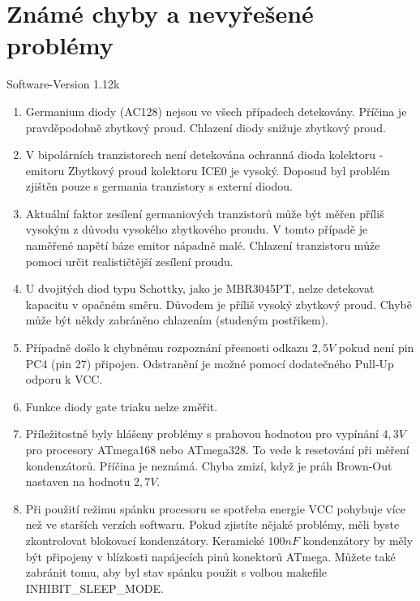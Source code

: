 \chapter{Známé chyby a nevyřešené problémy}
\vspace*{-1cm}
{\center Software-Version 1.12k}

\begin{enumerate}

\item Germanium diody (AC128) nejsou ve všech případech detekovány. Příčina je pravděpodobně zbytkový proud.
Chlazení diody snižuje zbytkový proud.

\item V bipolárních tranzistorech není detekována ochranná dioda kolektoru - emitoru
Zbytkový proud kolektoru ICE0 je vysoký. Doposud byl problém zjištěn pouze s germania tranzistory s
externí diodou.

\item Aktuální faktor zesílení germaniových tranzistorů může být měřen příliš vysokým z důvodu vysokého zbytkového proudu.
V tomto případě je naměřené napětí báze emitor nápadně malé.
Chlazení tranzistoru může pomoci určit realističtější zesílení proudu.

\item U dvojitých diod typu Schottky, jako je MBR3045PT, nelze detekovat kapacitu v opačném směru. Důvodem je příliš vysoký zbytkový proud. Chybě může být někdy zabráněno chlazením (studeným postřikem).

\item Případně došlo k chybnému rozpoznání přesnosti odkazu \(2,5V\) pokud není pin PC4 (pin 27) připojen.
Odstranění je možné pomocí dodatečného Pull-Up odporu k VCC.

\item Funkce diody gate triaku nelze změřit.

\item Příležitostně byly hlášeny problémy s prahovou hodnotou pro vypínání \(4,3V\) pro procesory ATmega168 nebo ATmega328. To vede k resetování při měření kondenzátorů. Příčina je neznámá.
Chyba zmizí, když je práh Brown-Out nastaven na hodnotu \(2,7V\).

\item Při použití režimu spánku procesoru se spotřeba energie VCC pohybuje více než
ve starších verzích softwaru.
Pokud zjistíte nějaké problémy, měli byste zkontrolovat blokovací kondenzátory.
Keramické \(100nF\) kondenzátory by měly být připojeny v blízkosti napájecích pinů konektorů ATmega.
Můžete také zabránit tomu, aby byl stav spánku použit s volbou makefile INHIBIT\_SLEEP\_MODE.


\end{enumerate}
